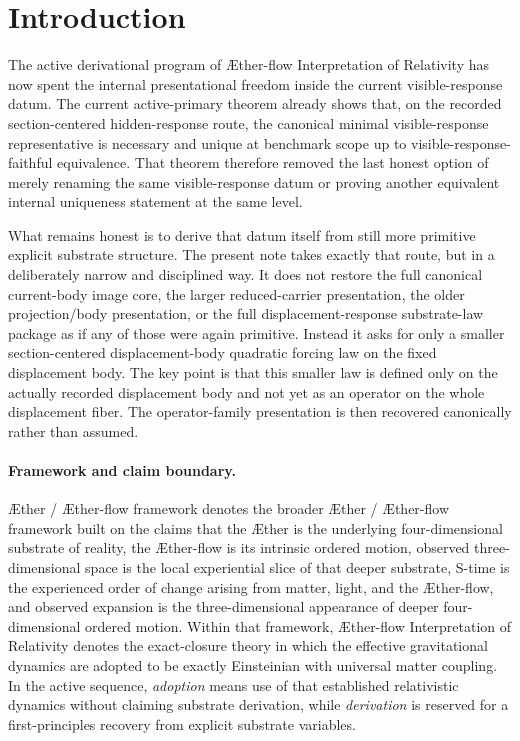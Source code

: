 \documentclass[11pt]{article}
\newcommand{\Aether}{\AE{}ther}
\newcommand{\Aflow}{\AE{}ther-flow}
\newcommand{\TheoryName}{\Aflow{} Interpretation of Relativity}
\newcommand{\TheoryProgram}{\Aether{} / \Aflow{} framework}
\begin{document}
\section{Introduction}

The active derivational program of \TheoryName{} has now spent the internal presentational freedom inside the current visible-response datum. The current active-primary theorem already shows that, on the recorded section-centered hidden-response route, the canonical minimal visible-response representative is necessary and unique at benchmark scope up to visible-response-faithful equivalence. That theorem therefore removed the last honest option of merely renaming the same visible-response datum or proving another equivalent internal uniqueness statement at the same level.

What remains honest is to derive that datum itself from still more primitive explicit substrate structure. The present note takes exactly that route, but in a deliberately narrow and disciplined way. It does not restore the full canonical current-body image core, the larger reduced-carrier presentation, the older projection/body presentation, or the full displacement-response substrate-law package as if any of those were again primitive. Instead it asks for only a smaller section-centered displacement-body quadratic forcing law on the fixed displacement body. The key point is that this smaller law is defined only on the actually recorded displacement body and not yet as an operator on the whole displacement fiber. The operator-family presentation is then recovered canonically rather than assumed.

\paragraph{Framework and claim boundary.}
\TheoryProgram{} denotes the broader \Aether{} / \Aflow{} framework built on the claims that the \Aether{} is the underlying four-dimensional substrate of reality, the \Aflow{} is its intrinsic ordered motion, observed three-dimensional space is the local experiential slice of that deeper substrate, S-time is the experienced order of change arising from matter, light, and the \Aflow{}, and observed expansion is the three-dimensional appearance of deeper four-dimensional ordered motion. Within that framework, \TheoryName{} denotes the exact-closure theory in which the effective gravitational dynamics are adopted to be exactly Einsteinian with universal matter coupling. In the active sequence, \emph{adoption} means use of that established relativistic dynamics without claiming substrate derivation, while \emph{derivation} is reserved for a first-principles recovery from explicit substrate variables.
\end{document}
